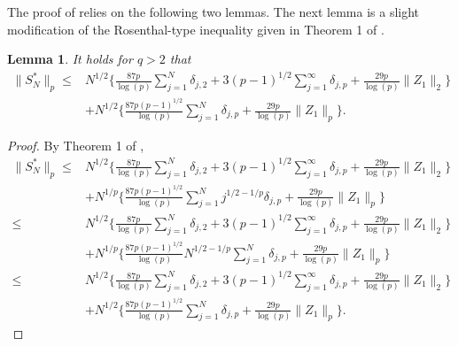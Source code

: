 \documentclass[11pt]{article}
\theoremstyle{plain}
\newtheorem{lemma}[theorem]{Lemma}
\theoremstyle{definition}
\begin{document}
The proof of  relies on the following two lemmas. The next lemma is a slight modification of the Rosenthal-type inequality given in Theorem 1 of \cite{liu2013probability}.
 
\begin{lemma} \label{lemma:sup of functional dependence}
It holds for $q > 2$ that
  \begin{align*}
  \| S^*_N\|_p  \le  
    & N^{1/2 }\bigg\{\frac{87p }{\log(p)} \sum_{j=1}^N \delta_{j,2} + 3(p-1)^{1/2}\sum_{j=1}^\infty \delta_{j,p} +\frac{29p }{ \log(p)} \| Z_1\|_2  \bigg\}
  \\ 
  &+ N^{1/2} \bigg\{ \frac{87p (p-1)^{1/2}}{\log(p)}  \sum_{j=1}^N \delta_{j, p} + \frac{29p}{\log(p)}\|Z_1\|_p \bigg\}  .
  \end{align*}
   
   
   \end{lemma}
   \begin{proof} By Theorem 1 of  \cite{liu2013probability},
   \begin{align*}
  \| S^*_N\|_p  \le & N^{1/2 }\bigg\{\frac{87p }{\log(p)} \sum_{j=1}^N \delta_{j,2} + 3(p-1)^{1/2}\sum_{j=1}^\infty \delta_{j,p} +\frac{29p }{ \log(p)} \| Z_1\|_2  \bigg\}
  \\ 
  &+ N^{1/p} \bigg\{ \frac{87p (p-1)^{1/2}}{\log(p)} \sum_{j=1}^N j^{1/2-1/p}\delta_{j, p} + \frac{29p}{\log(p)}\|Z_1\|_p \bigg\}
  \\
  \le & N^{1/2 }\bigg\{\frac{87p }{\log(p)} \sum_{j=1}^N \delta_{j,2} + 3(p-1)^{1/2}\sum_{j=1}^\infty \delta_{j,p} +\frac{29p }{ \log(p)} \| Z_1\|_2  \bigg\}
  \\ 
  &+ N^{1/p} \bigg\{ \frac{87p (p-1)^{1/2}}{\log(p)} N^{1/2-1/p}\sum_{j=1}^N \delta_{j, p} + \frac{29p}{\log(p)}\|Z_1\|_p \bigg\} 
  \\
  \le   & N^{1/2 }\bigg\{\frac{87p }{\log(p)} \sum_{j=1}^N \delta_{j,2} + 3(p-1)^{1/2}\sum_{j=1}^\infty \delta_{j,p} +\frac{29p }{ \log(p)} \| Z_1\|_2  \bigg\}
  \\ 
  &+ N^{1/2} \bigg\{ \frac{87p (p-1)^{1/2}}{\log(p)}  \sum_{j=1}^N \delta_{j, p} + \frac{29p}{\log(p)}\|Z_1\|_p \bigg\}  .
  \end{align*} 
   
   \end{proof}
 
\end{document}
